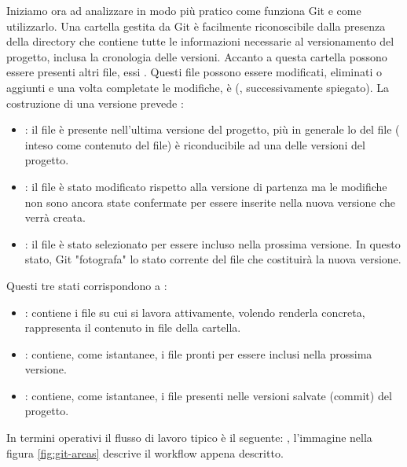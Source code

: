 Iniziamo ora ad analizzare in modo più pratico come funziona Git e come utilizzarlo. Una cartella gestita da Git è facilmente riconoscibile dalla presenza della directory  che contiene tutte le informazioni necessarie al versionamento del progetto, inclusa la cronologia delle versioni. 
Accanto a questa cartella possono essere presenti altri file, essi . Questi file possono essere modificati, eliminati o aggiunti e una volta completate le modifiche, è  (, successivamente spiegato). La costruzione di una versione prevede :
\begin{itemize}
	\item {}: il file è presente nell'ultima versione del progetto, più in generale lo  del file ( inteso come contenuto del file) è riconducibile ad una delle versioni del progetto.
	\item {}: il file è stato modificato rispetto alla versione di partenza ma le modifiche non sono ancora state confermate per essere inserite nella nuova versione che verrà creata.
	\item {}: il file è stato selezionato per essere incluso nella prossima versione. In questo stato, Git "fotografa" lo stato corrente del file che costituirà la nuova versione.
\end{itemize}
Questi tre stati corrispondono a :
\begin{itemize}
	\item {}: contiene i file su cui si lavora attivamente, volendo renderla concreta, rappresenta il contenuto in file della cartella.
	\item {}: contiene, come istantanee, i file pronti per essere inclusi nella prossima versione. 
	\item {}: contiene, come istantanee, i file presenti nelle versioni salvate (commit) del progetto.
\end{itemize}
In termini operativi il flusso di lavoro tipico è il seguente: , l'immagine nella figura \ref{fig:git-areas} descrive il workflow appena descritto.

